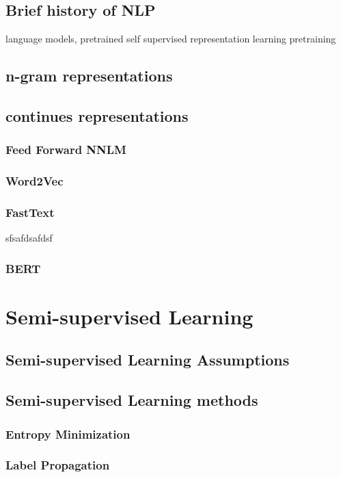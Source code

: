 \documentclass[12pt]{article}
\begin{document}
    \subsection{Brief history of NLP}
    language models, pretrained self supervised representation learning
    pretraining
    \subsection{n-gram representations}
    \subsection{continues representations}
        \subsubsection{Feed Forward NNLM}
        \subsubsection{Word2Vec}
        \subsubsection{FastText}
        sfsafdsafdsf
        
        \subsubsection{BERT}
        
\section{Semi-supervised Learning}
        \subsection{Semi-supervised Learning Assumptions}
        \subsection{Semi-supervised Learning methods}
            \subsubsection{Entropy Minimization}
            \subsubsection{Label Propagation}
\end{document}
